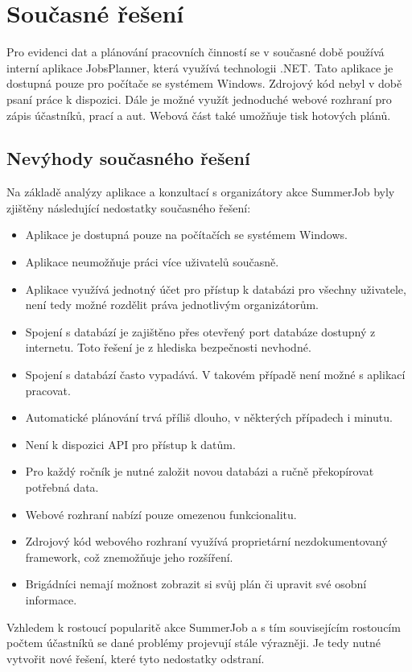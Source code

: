 \chapter{Současné řešení}

Pro evidenci dat a plánování pracovních činností se v současné době používá interní aplikace JobsPlanner, která využívá technologii .NET. Tato aplikace je dostupná pouze pro počítače se systémem
Windows. Zdrojový kód nebyl v době psaní práce k dispozici. Dále je možné využít jednoduché webové rozhraní pro zápis účastníků, prací a aut. Webová část také umožňuje tisk hotových plánů.

\section{Nevýhody současného řešení}

Na základě analýzy aplikace a konzultací s organizátory akce SummerJob byly zjištěny následující nedostatky současného řešení:

\begin{itemize}
    \item Aplikace je dostupná pouze na počítačích se systémem Windows.
    \item Aplikace neumožňuje práci více uživatelů současně.
    \item Aplikace využívá jednotný účet pro přístup k databázi pro všechny uživatele, není tedy možné rozdělit práva jednotlivým organizátorům.
    \item Spojení s databází je zajištěno přes otevřený port databáze dostupný z internetu. Toto řešení je z hlediska bezpečnosti nevhodné.
    \item Spojení s databází často vypadává. V takovém případě není možné s aplikací pracovat.
    \item Automatické plánování trvá příliš dlouho, v některých případech i minutu.
    \item Není k dispozici API pro přístup k datům.
    \item Pro každý ročník je nutné založit novou databázi a ručně překopírovat potřebná data.
    \item Webové rozhraní nabízí pouze omezenou funkcionalitu.
    \item Zdrojový kód webového rozhraní využívá proprietární nezdokumentovaný framework, což znemožňuje jeho rozšíření.
    \item Brigádníci nemají možnost zobrazit si svůj plán či upravit své osobní informace.
\end{itemize}

Vzhledem k rostoucí popularitě akce SummerJob a s tím souvisejícím rostoucím počtem účastníků se dané problémy projevují stále výrazněji.
Je tedy nutné vytvořit nové řešení, které tyto nedostatky odstraní.
